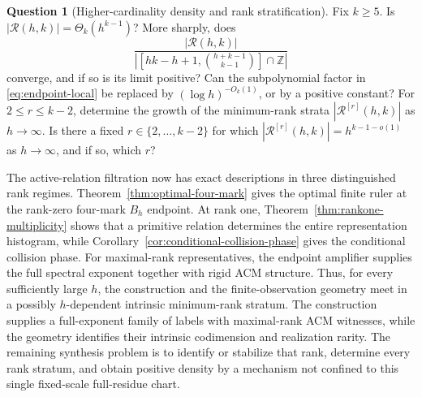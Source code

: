 \documentclass[11pt,reqno]{amsart}
\theoremstyle{definition}
\newtheorem{question}[theorem]{Question}
\theoremstyle{remark}
\newcommand{\Z}{\mathbb Z}
\newcommand{\Rcal}{\mathcal R}
\begin{document}
\begin{question}[Higher-cardinality density and rank stratification]
\label{q:higher-spectrum}
Fix $k\geq5$.  Is $|\Rcal(h,k)|=\Theta_k(h^{k-1})$?  More sharply, does
\[
 \frac{|\Rcal(h,k)|}
 {|[hk-h+1,\binom{h+k-1}{k-1}]\cap\Z|}
\]
converge, and if so is its limit positive?  Can the subpolynomial factor in
\eqref{eq:endpoint-local} be replaced by $(\log h)^{-O_k(1)}$, or by a
positive constant?  For
$2\leq r\leq k-2$, determine the growth of the minimum-rank strata
$|\Rcal^{[r]}(h,k)|$ as $h\to\infty$.  Is there a fixed
$r\in\{2,\ldots,k-2\}$ for which
$|\Rcal^{[r]}(h,k)|=h^{k-1-o(1)}$ as $h\to\infty$, and if so, which $r$?
\end{question}

The active-relation filtration now has exact descriptions in three
distinguished rank regimes.  Theorem~\ref{thm:optimal-four-mark} gives the
optimal finite ruler at the rank-zero four-mark $B_h$ endpoint.  At rank one,
Theorem~\ref{thm:rankone-multiplicity} shows that a primitive relation
determines the entire representation histogram, while
Corollary~\ref{cor:conditional-collision-phase} gives the conditional
collision phase.  For maximal-rank
representatives, the endpoint amplifier supplies the full spectral exponent
together with rigid ACM structure.  Thus, for every sufficiently large $h$,
the construction and the finite-observation geometry meet in a possibly
$h$-dependent intrinsic minimum-rank stratum.  The construction supplies a
full-exponent family of labels with maximal-rank ACM witnesses, while the
geometry identifies their intrinsic codimension and realization rarity.  The
remaining synthesis problem is to identify or stabilize that rank, determine
every rank stratum, and obtain positive density by a mechanism not confined
to this single fixed-scale full-residue chart.
\end{document}
